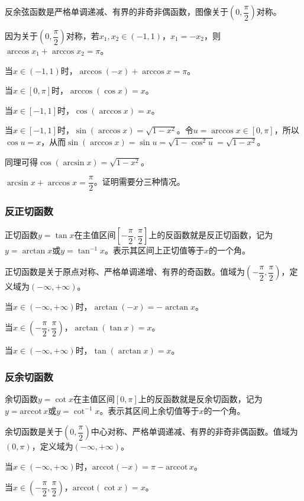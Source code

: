 \documentclass[UTF8, 12pt]{ctexart}
\begin{document}
反余弦函数是严格单调递减、有界的非奇非偶函数，图像关于$\left(0,\dfrac{\pi}{2}\right)$对称。

因为关于$\left(0,\dfrac{\pi}{2}\right)$对称，若$x_1,x_2\in(-1,1)$，$x_1=-x_2$，则$\arccos x_1+\arccos x_2=\pi$。

当$x\in(-1,1)$时，$\arccos(-x)+\arccos x=\pi$。

当$x\in[0,\pi]$时，$\arccos(\cos x)=x$。

当$x\in[-1,1]$时，$\cos(\arccos x)=x$。

当$x\in[-1,1]$时，$\sin(\arccos x)=\sqrt{1-x^2}$。令$u=\arccos x\in[0,\pi]$，所以$\cos u=x$，从而$\sin(\arccos x)=\sin u=\sqrt{1-\cos^2u}=\sqrt{1-x^2}$。

同理可得$\cos(\arcsin x)=\sqrt{1-x^2}$。

$\arcsin x+\arccos x=\dfrac{\pi}{2}$。证明需要分三种情况。

\subsubsection{反正切函数}

正切函数$y=\tan x$在主值区间$\left[-\dfrac{\pi}{2},\dfrac{\pi}{2}\right]$上的反函数就是反正切函数，记为$y=\arctan x$或$y=\tan^{-1}x$。表示其区间上正切值等于$x$的一个角。

正切函数是关于原点对称、严格单调递增、有界的奇函数。值域为$\left(-\dfrac{\pi}{2},\dfrac{\pi}{2}\right)$，定义域为$(-\infty,+\infty)$。

当$x\in(-\infty,+\infty)$时，$\arctan(-x)=-\arctan x$。

当$x\in\left(-\dfrac{\pi}{2},\dfrac{\pi}{2}\right)$，$\arctan(\tan x)=x$。

当$x\in(-\infty,+\infty)$时，$\tan(\arctan x)=x$。

\subsubsection{反余切函数}

余切函数$y=\cot x$在主值区间$[0,\pi]$上的反函数就是反余切函数，记为$y=\textrm{arccot}\,x$或$y=\cot^{-1}x$。表示其区间上余切值等于$x$的一个角。

余切函数是关于$\left(0,\dfrac{\pi}{2}\right)$中心对称、严格单调递减、有界的非奇非偶函数。值域为$(0,\pi)$，定义域为$(-\infty,+\infty)$。

当$x\in(-\infty,+\infty)$时，$\textrm{arccot}(-x)=\pi-\textrm{arccot}\,x$。

当$x\in\left(-\dfrac{\pi}{2},\dfrac{\pi}{2}\right)$，$\textrm{arccot}(\cot x)=x$。
\end{document}
